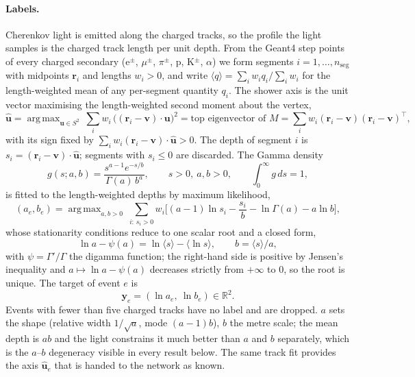 \documentclass[11pt]{article}
\theoremstyle{definition}
\newcommand{\y}{\bm{y}}
\newcommand{\R}{\mathbb{R}}
\DeclareMathOperator*{\argmax}{arg\,max}
\begin{document}
\paragraph{Labels.}
Cherenkov light is emitted along the charged tracks, so the profile the light samples is the charged track length
per unit depth. From the Geant4 step points of every charged secondary (e$^\pm$, $\mu^\pm$, $\pi^\pm$, p,
K$^\pm$, $\alpha$) we form segments $i=1,\dots,n_{\mathrm{seg}}$ with midpoints $\bm r_i$ and lengths $w_i>0$, and
write $\langle q\rangle = \sum_i w_i q_i/\sum_i w_i$ for the length-weighted mean of any per-segment quantity
$q_i$. The shower axis is the unit vector maximising the length-weighted second moment about the vertex,
\begin{equation}
  \hat{\bm u} = \argmax_{\bm u\in S^2}\ \sum_i w_i\,\big((\bm r_i-\bm v)\cdot\bm u\big)^2
  = \text{top eigenvector of } M=\sum_i w_i(\bm r_i-\bm v)(\bm r_i-\bm v)^\top,
  \label{eq:axis}
\end{equation}
with its sign fixed by $\sum_i w_i(\bm r_i-\bm v)\cdot\hat{\bm u}>0$. The depth of segment $i$ is
$s_i = (\bm r_i-\bm v)\cdot\hat{\bm u}$; segments with $s_i\le0$ are discarded. The Gamma density
\begin{equation}
  g(s;a,b) = \frac{s^{a-1}e^{-s/b}}{\Gamma(a)\,b^{a}},\qquad s>0,\ a,b>0,\qquad \int_0^\infty g\,ds = 1,
\end{equation}
is fitted to the length-weighted depths by maximum likelihood,
\begin{equation}
  (a_e,b_e) = \argmax_{a,b>0}\ \sum_{i:\,s_i>0} w_i\Big[(a-1)\ln s_i - \frac{s_i}{b} - \ln\Gamma(a) - a\ln b\Big],
  \label{eq:label}
\end{equation}
whose stationarity conditions reduce to one scalar root and a closed form,
\begin{equation}
  \ln a - \psi(a) = \ln\langle s\rangle - \langle\ln s\rangle,\qquad b = \langle s\rangle/a,
  \label{eq:mle}
\end{equation}
with $\psi=\Gamma'/\Gamma$ the digamma function; the right-hand side is positive by Jensen's inequality and
$a\mapsto\ln a-\psi(a)$ decreases strictly from $+\infty$ to $0$, so the root is unique. The target of event $e$ is
\begin{equation}
  \y_e = (\ln a_e,\ \ln b_e)\in\R^2 .
\end{equation}
Events with fewer than five charged tracks have no label and are dropped. $a$ sets the shape (relative width
$1/\sqrt a$, mode $(a-1)b$), $b$ the metre scale; the mean depth is $ab$ and the light constrains it much better
than $a$ and $b$ separately, which is the $a$--$b$ degeneracy visible in every result below. The same track fit
provides the axis $\hat{\bm u}_e$ that is handed to the network as known.
\end{document}
